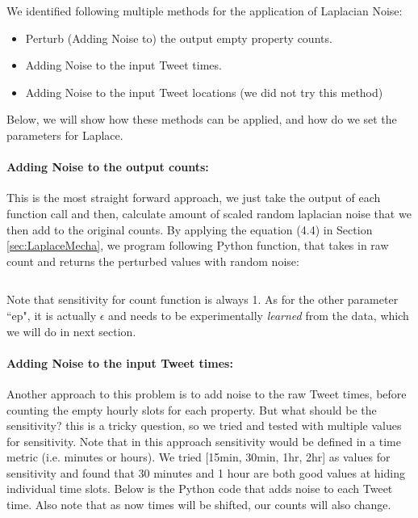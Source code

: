 \documentclass[12pt]{report}
\theoremstyle{named}
\begin{document}
We identified following multiple methods for the application of Laplacian Noise:
\begin{itemize}
  \item Perturb (Adding Noise to) the output empty property counts.
  \item Adding Noise to the input Tweet times.
  \item Adding Noise to the input Tweet locations (we did not try this method)
\end{itemize}

Below, we will show how these methods can be applied, and how do we set the parameters for Laplace.

\paragraph{Adding Noise to the output counts:\\}
This is the most straight forward approach, we just take the output of each function call and then, calculate amount of scaled random laplacian noise that we then add to the original counts.
By applying the equation (4.4) in Section \ref{sec:LaplaceMecha}, we program following Python function, that takes in raw count and returns the perturbed values with random noise:

\inputminted{python}{AddLaplaceCount.py}

Note that sensitivity for count function is always 1. As for the other parameter ``ep", it is actually $\epsilon$ and needs to be experimentally \textit{learned} from the data, which we will do in next section.


\paragraph{Adding Noise to the input Tweet times:\\}
Another approach to this problem is to add noise to the raw Tweet times, before counting the empty hourly slots for each property. But what should be the sensitivity? this is a tricky question, so we tried and tested with multiple values for sensitivity. Note that in this approach sensitivity would be defined in a time metric (i.e. minutes or hours). We tried [15min, 30min, 1hr, 2hr] as values for sensitivity and found that 30 minutes and 1 hour are both good values at hiding individual time slots. Below is the Python code that adds noise to each Tweet time. Also note that as now times will be shifted, our counts will also change.
\end{document}
